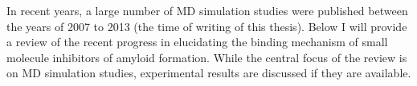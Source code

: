 
In recent years, a large number of MD simulation studies were published between the years of 2007 to 2013 (the time of writing of this thesis). Below I will provide a review of the recent progress in elucidating the binding mechanism of small molecule inhibitors of amyloid formation.  While the central focus of the review is on MD simulation studies, experimental results are discussed if they are available.


